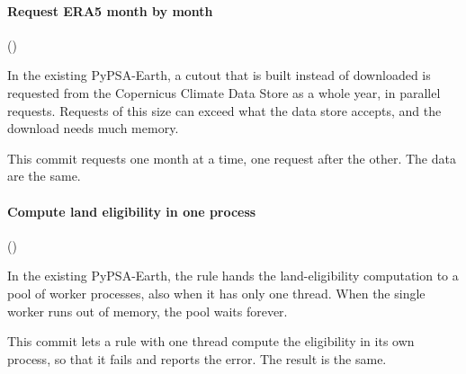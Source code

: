 \paragraph{Request ERA5 month by month} ()

In the existing PyPSA-Earth, a cutout that is built instead of downloaded is requested from the Copernicus Climate Data Store as a whole year, in parallel requests.
Requests of this size can exceed what the data store accepts, and the download needs much memory.

This commit requests one month at a time, one request after the other.
The data are the same.

\paragraph{Compute land eligibility in one process} ()

In the existing PyPSA-Earth, the rule hands the land-eligibility computation to a pool of worker processes, also when it has only one thread.
When the single worker runs out of memory, the pool waits forever.

This commit lets a rule with one thread compute the eligibility in its own process, so that it fails and reports the error.
The result is the same.
